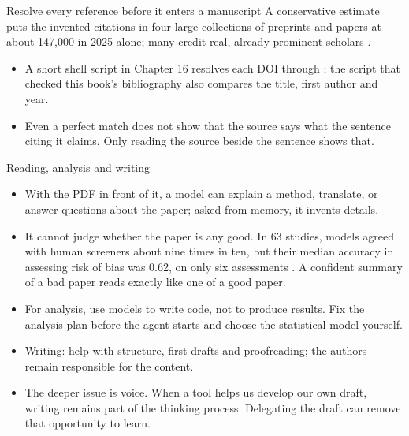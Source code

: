 \documentclass[11pt,aspectratio=169]{beamer}
\begin{document}
\begin{frame}{Resolve every reference before it enters a manuscript}
  \small A conservative estimate puts the invented citations in four large
  collections of preprints and papers at about 147,000 in 2025 alone; many
  credit real, already prominent scholars \parencite{zhao2026citations}.
  \begin{itemize}
    \item A short shell script in Chapter 16 resolves each DOI through
      ; the script that checked this book's bibliography also
      compares the title, first author and year.
    \item Even a perfect match does not show that the source says what the
      sentence citing it claims. Only reading the source beside the sentence
      shows that.
  \end{itemize}
\end{frame}

\begin{frame}{Reading, analysis and writing}
  \small
  \begin{itemize}
    \item With the PDF in front of it, a model can explain a method, translate,
      or answer questions about the paper; asked from memory, it invents
      details.
    \item It cannot judge whether the paper is any good. In 63 studies, models
      agreed with human screeners about nine times in ten, but their median
      accuracy in assessing risk of bias was 0.62, on only six assessments
      \parencite{laignelot2026systematicreviews}. A confident summary of a bad
      paper reads exactly like one of a good paper.
    \item For analysis, use models to write code, not to produce results. Fix
      the analysis plan before the agent starts and choose the statistical
      model yourself.
    \item Writing: help with structure, first drafts and proofreading; the
      authors remain responsible for the content.
    \item The deeper issue is voice. When a tool helps us develop our own
      draft, writing remains part of the thinking process. Delegating the
      draft can remove that opportunity to learn.
  \end{itemize}
\end{frame}
\end{document}
